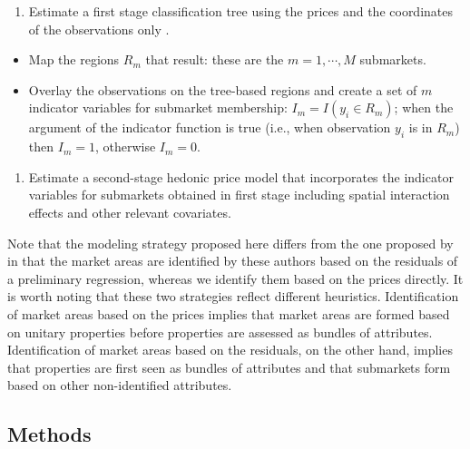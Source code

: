 \documentclass[Royal,times,sageh]{sagej}
\providecommand{\tightlist}{%
  \setlength{\itemsep}{0pt}\setlength{\parskip}{0pt}}
\begin{document}
\begin{enumerate}
\def\labelenumi{\arabic{enumi}.}
\tightlist
\item
  Estimate a first stage classification tree using the prices and the
  coordinates of the observations only \citep[similar to trend surface
  analysis, see][]{Unwin1978introduction}.
\end{enumerate}

\begin{itemize}
\tightlist
\item
  Map the regions \(R_m\) that result: these are the \(m=1,\cdots,M\)
  submarkets.
\item
  Overlay the observations on the tree-based regions and create a set of
  \(m\) indicator variables for submarket membership:
  \(I_m=I(y_i\in R_m)\); when the argument of the indicator function is
  true (i.e., when observation \(y_i\) is in \(R_m\)) then \(I_m=1\),
  otherwise \(I_m=0\).
\end{itemize}

\begin{enumerate}
\def\labelenumi{\arabic{enumi}.}
\setcounter{enumi}{1}
\tightlist
\item
  Estimate a second-stage hedonic price model that incorporates the
  indicator variables for submarkets obtained in first stage including
  spatial interaction effects and other relevant covariates.
\end{enumerate}

Note that the modeling strategy proposed here differs from the one
proposed by \citet{Fuss2016role} in that the market areas are identified
by these authors based on the residuals of a preliminary regression,
whereas we identify them based on the prices directly. It is worth
noting that these two strategies reflect different heuristics.
Identification of market areas based on the prices implies that market
areas are formed based on unitary properties before properties are
assessed as bundles of attributes. Identification of market areas based
on the residuals, on the other hand, implies that properties are first
seen as bundles of attributes and that submarkets form based on other
non-identified attributes.

\hypertarget{methods}{%
\subsection{Methods}\label{methods}}
\end{document}
